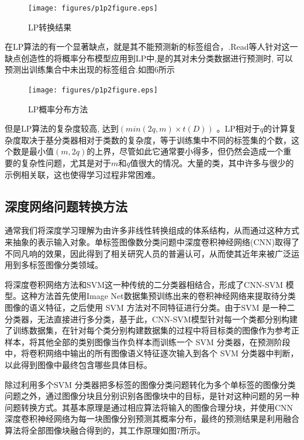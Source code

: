 \begin{figure}[htbp!]
	\centering
	\texttt{[image: figures/p1p2figure.eps]}
	\caption{LP转换结果}\label{fig:simuP1P2Result}
	\vspace{-1em}
\end{figure}

在LP算法的有一个显著缺点，就是其不能预测新的标签组合，.Read等人针对这一缺点创造性的将概率分布模型应用到LP中,是的其对未分类数据进行预测时, 可以预测出训练集合中未出现的标签组合\cite{Agrawal2013Multi}.如图6所示

\begin{figure}[htbp!]
	\centering
	\texttt{[image: figures/p1p2figure.eps]}
	\caption{LP概率分布方法}\label{fig:simuP1P2Result}
	\vspace{-1em}
\end{figure}

但是LP算法的复杂度较高, 达到$(min(2q, m)\times t(D))$ 。LP相对于$q$的计算复杂度取决于基分类器相对于类数的复杂度，等于训练集中不同的标签集的个数，这个数是最小值$(m,2q)$的上界，尽管如此它通常要小得多，但仍然会造成一个重要的复杂性问题，尤其是对于$m$和$q$值很大的情况。大量的类，其中许多与很少的示例相关联，这也使得学习过程非常困难。

\subsection{深度网络问题转换方法}

通常我们将深度学习理解为由许多非线性转换组成的体系结构，从而通过这种方式来抽象的表示输入对象。单标签图像数分类问题中深度卷积神经网络(CNN)取得了不同凡响的效果，因此得到了相关研究人员的普遍认可，从而使其近年来被广泛运用到多标签图像分类领域。

将深度卷积网络方法和SVM这一种传统的二分类器相结合，形成了CNN-SVM 模型。这种方法首先使用Image Net数据集预训练出来的卷积神经网络来提取待分类图像的语义特征，之后使用 SVM 方法对不同特征进行分类。由于SVM 是一种二分类器，无法直接进行多分类，基于此，CNN-SVM模型针对每一个类都分别构建了训练数据集，在针对每个类分别构建数据集的过程中将目标类的图像作为参考正样本，将其他全部的类别图像当作负样本而训练一个 SVM 分类器，在预测阶段中，将卷积网络中输出的所有图像语义特征逐次输入到各个 SVM 分类器中判断，以此得到图像中最终包含哪些具体目标。

除过利用多个SVM 分类器把多标签的图像分类问题转化为多个单标签的图像分类问题之外，通过图像分块且分别识别各图像块中的目标，是针对这种问题的另一种问题转换方式。其基本原理是通过相应算法将输入的图像合理分块，并使用CNN深度卷积神经网络为每一块图像分别预测其概率分布，最终的预测结果是利用融合算法将全部图像块融合得到的，其工作原理如图7所示。


